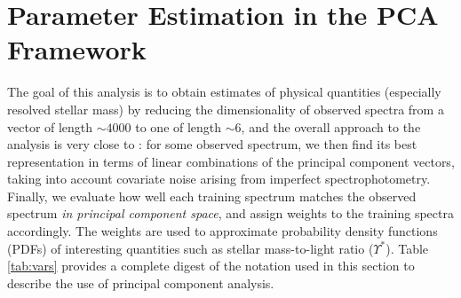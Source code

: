 \section{Parameter Estimation in the PCA Framework}
\label{chap1:sec:method}

The goal of this analysis is to obtain estimates of physical quantities (especially resolved stellar mass) by reducing the dimensionality of observed spectra from a vector of length $\sim 4000$ to one of length $\sim 6$, and the overall approach to the analysis is very close to : for some observed spectrum, we then find its best representation in terms of linear combinations of the principal component vectors, taking into account covariate noise arising from imperfect spectrophotometry. Finally, we evaluate how well each training spectrum matches the observed spectrum \emph{in principal component space}, and assign weights to the training spectra accordingly. The weights are used to approximate probability density functions (PDFs) of interesting quantities such as stellar mass-to-light ratio ($\Upsilon^*$). Table \ref{tab:vars} provides a complete digest of the notation used in this section to describe the use of principal component analysis.

